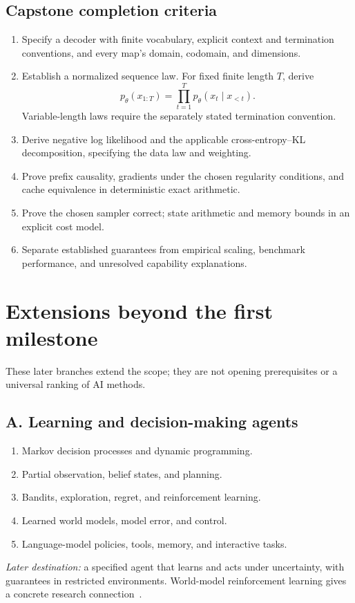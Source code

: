 \documentclass[11pt,oneside]{book}
\begin{document}
\section*{Capstone completion criteria}
\begin{enumerate}[leftmargin=1.8em]
\item Specify a decoder with finite vocabulary, explicit context and termination
conventions, and every map's domain, codomain, and dimensions.
\item Establish a normalized sequence law. For fixed finite length $T$, derive
\[
p_\theta(x_{1:T})=\prod_{t=1}^T p_\theta(x_t\mid x_{<t}).
\]
Variable-length laws require the separately stated termination convention.
\item Derive negative log likelihood and the applicable cross-entropy--KL
decomposition, specifying the data law and weighting.
\item Prove prefix causality, gradients under the chosen regularity conditions,
and cache equivalence in deterministic exact arithmetic.
\item Prove the chosen sampler correct; state arithmetic and memory bounds
in an explicit cost model.
\item Separate established guarantees from empirical scaling, benchmark
performance, and unresolved capability explanations.
\end{enumerate}

\chapter*{Extensions beyond the first milestone}

These later branches extend the scope; they are not opening prerequisites
or a universal ranking of AI methods.

\section*{A. Learning and decision-making agents}
\begin{enumerate}[leftmargin=1.8em]
\item Markov decision processes and dynamic programming.
\item Partial observation, belief states, and planning.
\item Bandits, exploration, regret, and reinforcement learning.
\item Learned world models, model error, and control.
\item Language-model policies, tools, memory, and interactive tasks.
\end{enumerate}
\textit{Later destination:} a specified agent that learns and acts under
uncertainty, with guarantees in restricted environments. World-model
reinforcement learning gives a concrete research connection~\cite{dreamer}.
\end{document}
